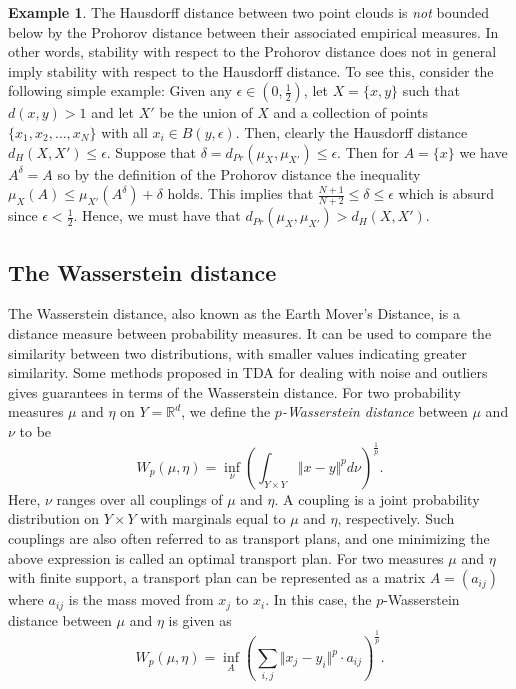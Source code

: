 \documentclass[10pt,a4paper]{article}
\theoremstyle{definition}
\newtheorem{ex}{Example}[thm]
\newcommand{\R}{\mathbb{R}}
\begin{document}

\begin{ex}
	The Hausdorff distance between two point clouds is \textit{not} bounded below by the Prohorov distance between their associated empirical measures. In other words, stability with respect to the Prohorov distance does not in general imply stability with respect to the Hausdorff distance. To see this, consider the following simple example: Given any $\epsilon\in(0,\frac{1}{2})$, let $X=\{x,y\}$ such that $d(x,y)>1$ and let $X'$ be the union of $X$ and a collection of points $\{x_1, x_2,\ldots,x_N\}$ with all $x_i\in B(y,\epsilon)$. Then, clearly the Hausdorff distance $d_H(X,X')\leq\epsilon$. Suppose that $\delta = d_{Pr}(\mu_X, \mu_{X'})\leq\epsilon$. Then for $A=\{x\}$ we have $A^\delta=A$ so by the definition of the Prohorov distance the inequality $\mu_X(A)\leq\mu_{X'}(A^\delta)+\delta$ holds. This implies that $\frac{N+1}{N+2}\leq\delta\leq\epsilon$ which is absurd since $\epsilon<\frac{1}{2}$. Hence, we must have that $d_{Pr}(\mu_X, \mu_{X'})>d_H(X,X')$.
\end{ex}

\subsection{The Wasserstein distance}
The Wasserstein distance, also known as the Earth Mover's Distance, is a distance measure between probability measures. It can be used to compare the similarity between two distributions, with smaller values indicating greater similarity. Some methods proposed in TDA for dealing with noise and outliers gives guarantees in terms of the Wasserstein distance. For two probability measures $\mu$ and $\eta$ on $Y=\R^d$, we define the \textit{$p$-Wasserstein distance} between $\mu$ and $\nu$ to be
$$
W_p(\mu, \eta) = \inf_{\nu}\left(\int_{Y\times Y}\Vert x-y\Vert^p d\nu\right)^{\frac{1}{p}}.
$$
Here, $\nu$ ranges over all couplings of $\mu$ and $\eta$. A coupling is a joint probability distribution on $Y\times Y$ with marginals equal to $\mu$ and $\eta$, respectively. Such couplings are also often referred to as transport plans, and one minimizing the above expression is called an optimal transport plan. For two measures $\mu$ and $\eta$ with finite support, a transport plan can be represented as a matrix $A=(a_{ij})$ where $a_{ij}$ is the mass moved from $x_j$ to $x_i$. In this case, the $p$-Wasserstein distance between $\mu$ and $\eta$ is given as
$$
W_p(\mu, \eta) = \inf_A \left(\sum_{i,j}\Vert x_j - y_i\Vert^p\cdot a_{ij}\right)^{\frac{1}{p}}.
$$
\end{document}
